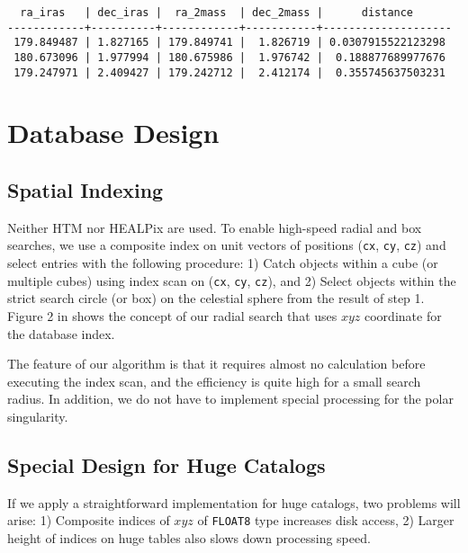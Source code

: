 {\small
\begin{verbatim}
  ra_iras   | dec_iras |  ra_2mass  | dec_2mass |      distance      
------------+----------+------------+-----------+--------------------
 179.849487 | 1.827165 | 179.849741 |  1.826719 | 0.0307915522123298
 180.673096 | 1.977994 | 180.675986 |  1.976742 |  0.188877689977676
 179.247971 | 2.409427 | 179.242712 |  2.412174 |  0.355745637503231
\end{verbatim}
}


\section{Database Design}

\subsection{Spatial Indexing}

Neither HTM \citep{kun_2000} nor HEALPix \citep{gor_2005} are used. To enable high-speed radial and box searches, we use a composite index on unit vectors of positions ({\tt cx}, {\tt cy}, {\tt cz}) and select entries with the following procedure: 1) Catch objects within a cube (or multiple cubes) using index scan on ({\tt cx}, {\tt cy}, {\tt cz}), and 2) Select objects within the strict search circle (or box) on the celestial sphere from the result of step 1. Figure 2 in \citet{yam_2011a} shows the concept of our radial search that uses $x$$y$$z$ coordinate for the database index.

The feature of our algorithm is that it requires almost no calculation before executing the index scan, and the efficiency is quite high for a small search radius. In addition, we do not have to implement special processing for the polar singularity.

\subsection{Special Design for Huge Catalogs}

\begin{figure}[t]
\end{figure}

If we apply a straightforward implementation for huge catalogs, two problems will arise: 1) Composite indices of $x$$y$$z$ of {\tt FLOAT8} type increases disk access, 2) Larger height of indices on huge tables also slows down processing speed.

